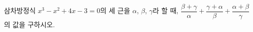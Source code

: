 삼차방정식 $x^3-x^2+4x-3=0$의 세 근을 $\alpha$, $\beta$, $\gamma$라 할 때, $\dfrac{\beta+\gamma}{\alpha}+\dfrac{\gamma+\alpha}{\beta}+\dfrac{\alpha+\beta}{\gamma}$의 값을 구하시오.
